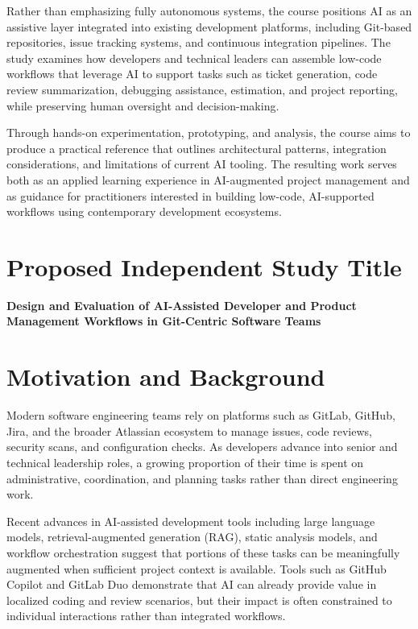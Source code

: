 \documentclass[11pt]{article}
\begin{document}
Rather than emphasizing fully autonomous systems, the course positions AI as an assistive layer integrated into existing development platforms, including Git-based repositories, issue tracking systems, and continuous integration pipelines. The study examines how developers and technical leaders can assemble low-code workflows that leverage AI to support tasks such as ticket generation, code review summarization, debugging assistance, estimation, and project reporting, while preserving human oversight and decision-making.

Through hands-on experimentation, prototyping, and analysis, the course aims to produce a practical reference that outlines architectural patterns, integration considerations, and limitations of current AI tooling. The resulting work serves both as an applied learning experience in AI-augmented project management and as guidance for practitioners interested in building low-code, AI-supported workflows using contemporary development ecosystems.


\section*{Proposed Independent Study Title}

\textbf{Design and Evaluation of AI-Assisted Developer and Product Management Workflows in Git-Centric Software Teams}

\section*{Motivation and Background}

Modern software engineering teams rely on platforms such as GitLab, GitHub, Jira, and the broader Atlassian ecosystem to manage issues, code reviews, security scans, and configuration checks. As developers advance into senior and technical leadership roles, a growing proportion of their time is spent on administrative, coordination, and planning tasks rather than direct engineering work.

Recent advances in AI-assisted development tools including large language models, retrieval-augmented generation (RAG), static analysis models, and workflow orchestration suggest that portions of these tasks can be meaningfully augmented when sufficient project context is available. Tools such as GitHub Copilot and GitLab Duo demonstrate that AI can already provide value in localized coding and review scenarios, but their impact is often constrained to individual interactions rather than integrated workflows.
\end{document}
